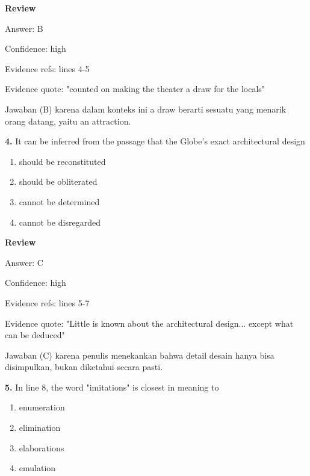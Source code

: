 \documentclass[12pt]{article}
\begin{document}
\par
\begingroup
\setlength{\parskip}{0pt}
\setlength{\parindent}{0pt}
\textbf{Review}\par
Answer: B\par
Confidence: high\par
Evidence refs: lines 4-5\par
Evidence quote: "counted on making the theater a draw for the locals"\par
Jawaban (B) karena dalam konteks ini a draw berarti sesuatu yang menarik orang datang, yaitu an attraction.\par
\endgroup
\par
\vspace{0.25\baselineskip}
\noindent\textbf{4.} It can be inferred from the passage that the Globe's exact architectural design
\begin{enumerate}[label=(\Alph*),leftmargin=*,itemsep=0.2em]
\item should be reconstituted
\item should be obliterated
\item cannot be determined
\item cannot be disregarded
\end{enumerate}
\par
\begingroup
\setlength{\parskip}{0pt}
\setlength{\parindent}{0pt}
\textbf{Review}\par
Answer: C\par
Confidence: high\par
Evidence refs: lines 5-7\par
Evidence quote: "Little is known about the architectural design... except what can be deduced"\par
Jawaban (C) karena penulis menekankan bahwa detail desain hanya bisa disimpulkan, bukan diketahui secara pasti.\par
\endgroup
\par
\vspace{0.25\baselineskip}
\noindent\textbf{5.} In line 8, the word "imitations" is closest in meaning to
\begin{enumerate}[label=(\Alph*),leftmargin=*,itemsep=0.2em]
\item enumeration
\item elimination
\item elaborations
\item emulation
\end{enumerate}
\par
\begingroup
\setlength{\parskip}{0pt}
\setlength{\parindent}{0pt}
\end{document}

